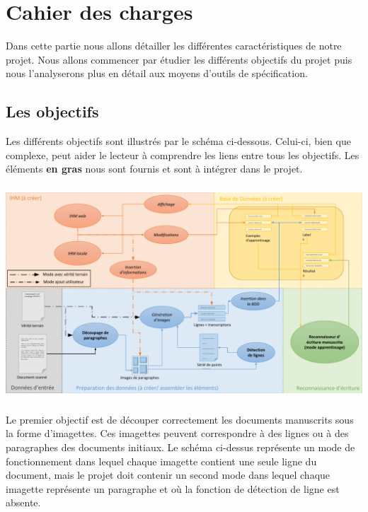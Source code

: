 \chapter{Cahier des charges}

Dans cette partie nous allons détailler les différentes caractéristiques
de notre projet. Nous allons commencer par étudier les différents objectifs
du projet puis nous l’analyserons plus en détail aux moyens d’outils de spécification.

\section{Les objectifs}

Les différents objectifs sont illustrés par le schéma ci-dessous. Celui-ci,
bien que complexe, peut aider le lecteur à comprendre les liens entre tous les objectifs.
Les éléments \textbf{en gras} nous sont fournis et sont à intégrer dans le projet.

\paragraph{}
\begin{mdframed}[frametitle={Schéma représentant les différents objectifs du projet}, innerbottommargin=10]
\begin{center}
\includegraphics[width=\linewidth]{schema.pdf}
\end{center}
\end{mdframed}

\paragraph{}
Le premier objectif est de découper correctement les documents manuscrits sous la forme
d’imagettes. Ces imagettes peuvent correspondre à des lignes ou à des paragraphes des documents initiaux.
Le schéma ci-dessus représente un mode de fonctionnement dans lequel chaque imagette contient
une seule ligne du document, mais le projet doit contenir un second mode dans lequel chaque imagette
représente un paragraphe et où la fonction de détection de ligne est absente.

